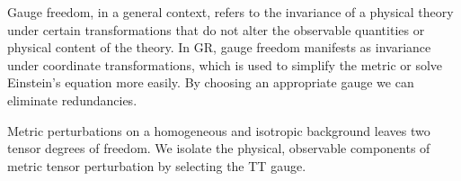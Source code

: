 



\newcommand{\pert}{\ALIASpert}           %
\newcommand*{\ah}{\ALIASah}                     %
\newcommand{\Ft}{\ALIASFt}
\newcommand{\dummy}{\ALIASdummy}
%
\newcommand*\mhat{\hat{\vec{m}}}
\newcommand*\nhat{\hat{\vec{n}}}
\newcommand*\Ohat{\hat{\vec{\varOmega}}}
%
\newcommand*{\polplus}{\ALIASpolplus}
\newcommand*{\polcross}{\ALIASpolcross}



Gauge freedom, in a general context, refers to the invariance of a physical theory under certain transformations that do not alter the observable quantities or physical content of the theory. In GR, gauge freedom manifests as invariance under coordinate transformations, which is used to simplify the metric or solve Einstein's equation more easily. By choosing an appropriate gauge we can eliminate redundancies. 

Metric perturbations on a homogeneous and isotropic background leaves two tensor degrees of freedom. %
We isolate the physical, observable components of metric tensor perturbation by selecting the TT gauge. %



